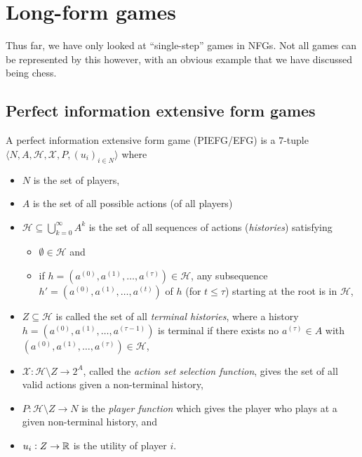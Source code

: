 \section{Long-form games}

Thus far, we have only looked at ``single-step'' games in NFGs. Not all games can be represented by this however, with an obvious example that we have discussed being chess.

\subsection{Perfect information extensive form games}

	\begin{fdef}
		A perfect information extensive form game (PIEFG/EFG) is a $7$-tuple $\langle N,A,\mathcal{H},\mathcal{X},P,(u_i)_{i\in N}\rangle$ where
		\begin{itemize}
			\item $N$ is the set of players,
			\item $A$ is the set of all possible actions (of all players)
			\item $\mathcal{H} \subseteq \bigcup_{k=0}^{\infty} A^k$ is the set of all sequences of actions (\emph{histories}) satisfying
			\begin{itemize}
				\item $\emptyset \in \mathcal{H}$ and
				\item if $h = (a^{(0)},a^{(1)},\ldots,a^{(\tau)}) \in \mathcal{H}$, any subsequence $h' = (a^{(0)},a^{(1)},\ldots,a^{(t)})$ of $h$ (for $t \le \tau$) starting at the root is in $\mathcal{H}$,
			\end{itemize}
			\item $Z \subseteq \mathcal{H}$ is called the set of all \emph{terminal histories}, where a history $h = (a^{(0)},a^{(1)},\ldots,a^{(\tau-1)})$ is terminal if there exists no $a^{(\tau)} \in A$ with $(a^{(0)},a^{(1)},\ldots,a^{(\tau)}) \in \mathcal{H}$,
			\item $\mathcal{X} : \mathcal{H} \setminus Z \to 2^A$, called the \emph{action set selection function}, gives the set of all valid actions given a non-terminal history,
			\item $P : \mathcal{H}\setminus Z \to N$ is the \emph{player function} which gives the player who plays at a given non-terminal history, and
			\item $u_i : Z \to \mathbb{R}$ is the utility of player $i$.
		\end{itemize}
	\end{fdef}


